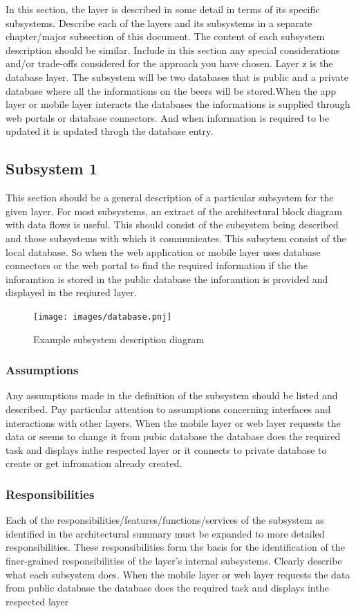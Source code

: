 In this section, the layer is described in some detail in terms of its specific subsystems. Describe each of the layers and its subsystems in a separate chapter/major subsection of this document. The content of each subsystem description should be similar. Include in this section any special considerations and/or trade-offs considered for the approach you have chosen.
Layer z is the database layer. The subsystem will be two databases that is public and a private database where all the informations on the beers will be stored.When the app layer or mobile layer interacts the databases the informations is supplied through web portals or database connectors. And when information is required to be updated it is updated throgh the database entry.
\subsection{Subsystem 1}
This section should be a general description of a particular subsystem for the given layer. For most subsystems, an extract of the architectural block diagram with data flows is useful. This should consist of the subsystem being described and those subsystems with which it communicates.
This subsytem consist of the local database. So when the web application or mobile layer uses database connectors or the web portal to find the required information if the the inforamtion is stored in the public database the inforamtion is provided and displayed in the reqiured layer.
\begin{figure}[h!]
	\centering
 	\texttt{[image: images/database.pnj]}
 \caption{Example subsystem description diagram}
\end{figure}

\subsubsection{Assumptions}
Any assumptions made in the definition of the subsystem should be listed and described. Pay particular attention to assumptions concerning interfaces and interactions with other layers.
When the mobile layer or web layer requests the data or seems to change it from pubic database the database does the required task and displays inthe respected layer or it connects to private database to create or get infromation already created.

\subsubsection{Responsibilities}
Each of the responsibilities/features/functions/services of the subsystem as identified in the architectural summary must be expanded to more detailed responsibilities. These responsibilities form the basis for the identification of the finer-grained responsibilities of the layer's internal subsystems. Clearly describe what each subsystem does.
When the mobile layer or web layer requests the data from public database the database does the required task and displays inthe respected layer
